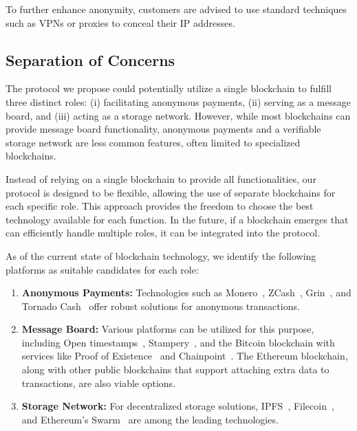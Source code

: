 \documentclass[pdftex,twocolumn,epjc3]{svjour3}
\begin{document}
To further enhance anonymity, customers are advised to use standard techniques such as VPNs or proxies to conceal their IP addresses.

\subsection{Separation of Concerns}\label{sec:separation-of-concerns}

\begin{sloppypar}
The protocol we propose could potentially utilize a single blockchain to fulfill three distinct roles: (i) facilitating anonymous payments, (ii) serving as a message board, and (iii) acting as a storage network. However, while most blockchains can provide message board functionality, anonymous payments and a verifiable storage network are less common features, often limited to specialized blockchains.

Instead of relying on a single blockchain to provide all functionalities, our protocol is designed to be flexible, allowing the use of separate blockchains for each specific role. This approach provides the freedom to choose the best technology available for each function. In the future, if a blockchain emerges that can efficiently handle multiple roles, it can be integrated into the protocol.

As of the current state of blockchain technology, we identify the following platforms as suitable candidates for each role:

\begin{enumerate}
    \item \textbf{Anonymous Payments:} Technologies such as Monero~\cite{vansaberhagenCryptoNote2013}, ZCash~\cite{ben-sassonZerocashDecentralizedAnonymous2014}, Grin~\cite{fuchsbauerAggregateCashSystems2019}, and Tornado Cash~\cite{pertsevTornadoCashPrivacy2019} offer robust solutions for anonymous transactions.
    \item \textbf{Message Board:} Various platforms can be utilized for this purpose, including Open timestamps~\cite{opentimestampsTimestampingProofStandard}, Stampery~\cite{crespoStamperyBlockchainTimestamping2017}, and the Bitcoin blockchain with services like Proof of Existence~\cite{proofofexistenceWebApplicationProve} and Chainpoint~\cite{chainpointBlockchainProofAnchoring}. The Ethereum blockchain, along with other public blockchains that support attaching extra data to transactions, are also viable options.
    \item \textbf{Storage Network:} For decentralized storage solutions, IPFS~\cite{benetIPFSContentAddressed2014}, Filecoin~\cite{protocollabsFilecoinDecentralizedStorage2017}, and Ethereum's Swarm~\cite{teamSWARMStorageCommunication2021} are among the leading technologies.
\end{enumerate}
\end{sloppypar}
\end{document}
